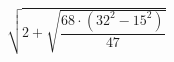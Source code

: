 \begin{ex}[type=calculate]
	\begin{condition}
		\( \sqrt{2+\sqrt{\dfrac{68\cdot(32^2-15^2)}{47}}} \)
	\end{condition}
\end{ex}